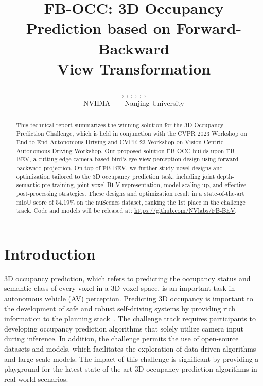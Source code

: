 \documentclass[10pt,twocolumn,letterpaper]{article}
\begin{document}
\title{FB-OCC: 3D Occupancy Prediction based on Forward-Backward\\View Transformation
}

\author{
,
,
,
,
,
,
\\ [0.15cm]
NVIDIA~~~~Nanjing University
}
\maketitle
\newcommand\blfootnote[1]{\begingroup
  \renewcommand\thefootnote{}\footnote{#1}\addtocounter{footnote}{-1}\endgroup
}






\begin{abstract}
This technical report summarizes the winning solution for the 3D Occupancy Prediction Challenge, which is held in conjunction with the CVPR 2023 Workshop on End-to-End Autonomous Driving and CVPR 23 Workshop on Vision-Centric Autonomous Driving Workshop. Our proposed solution FB-OCC builds upon FB-BEV, a cutting-edge camera-based bird's-eye view perception design using forward-backward projection. On top of FB-BEV, we further study novel designs and optimization tailored to the 3D occupancy prediction task, including joint depth-semantic pre-training, joint voxel-BEV representation, model scaling up, and effective post-processing strategies. These designs and optimization result in a state-of-the-art mIoU score of 54.19\% on the nuScenes dataset, ranking the 1st place in the challenge track. Code and models will be released at: \url{https://github.com/NVlabs/FB-BEV}.
\vspace{-5mm}
\end{abstract}

\section{Introduction}
3D occupancy prediction, which refers to predicting the occupancy status and semantic class of every voxel in a 3D voxel space, is an important task in autonomous vehicle (AV) perception. Predicting 3D occupancy is important to the development of safe and robust self-driving systems by providing rich information to the planning stack~\cite{hu2023planning}. The challenge track requires participants to developing occupancy prediction algorithms that solely utilize camera input during inference. In addition, the challenge permits the use of open-source datasets and models, which facilitates the exploration of data-driven algorithms and large-scale models. The impact of this challenge is significant by providing a playground for the latest state-of-the-art 3D occupancy prediction algorithms in real-world scenarios.
\end{document}
